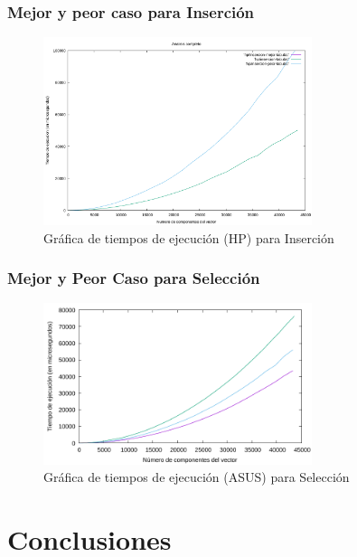 \documentclass[8pt, aspectratio=169]{beamer}
\begin{document}
    \begin{frame}
        \frametitle{Mejor y peor caso para Inserción}

        \begin{figure}
            \includegraphics[width=0.7\textwidth]{../data/hp-insercion-mp.pdf}
            \caption{Gráfica de tiempos de ejecución (HP) para Inserción}
        \end{figure}
    \end{frame}

    \begin{frame}
        \frametitle{Mejor y Peor Caso para Selección}
        \begin{figure}
            \includegraphics[width=0.7\textwidth]{../data/asus-seleccion-mp.pdf}
            \caption{Gráfica de tiempos de ejecución (ASUS) para Selección}
        \end{figure}
    \end{frame}

    \section{Conclusiones}
\end{document}
